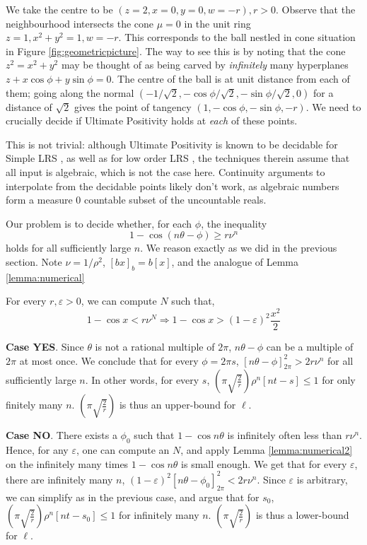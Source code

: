 We take the centre to be $(z = 2, x = 0, y= 0, w = -r), r > 0$. Observe that the neighbourhood intersects the cone $\mu = 0$ in the unit ring $z= 1, x^2 + y^2 = 1, w = -r$. This corresponds to the ball nestled in cone situation in Figure \ref{fig:geometricpicture}. The way to see this is by noting that the cone $z^2 = x^2 + y^2$ may be thought of as being carved by \textit{infinitely} many hyperplanes $z + x\cos \phi + y\sin \phi = 0$. The centre of the ball is at unit distance from each of them; going along the normal $(-1/\sqrt{2}, -\cos\phi/\sqrt{2}, -\sin\phi/\sqrt{2}, 0)$ for a distance of $\sqrt{2}$ gives the point of tangency $(1, -\cos\phi, -\sin\phi, -r)$. We need to crucially decide if Ultimate Positivity holds at \textit{each} of these points. 

This is not trivial: although Ultimate Positivity is known to be decidable for Simple LRS \cite{ouaknine2014ultimate}, as well as for low order LRS \cite{joeljames3}, the techniques therein assume that all input is algebraic, which is not the case here. Continuity arguments to interpolate from the decidable points likely don't work, as algebraic numbers form a measure $0$ countable subset of the uncountable reals.

Our problem is to decide whether, for each $\phi$, the inequality
\begin{equation}
\label{eq:ring}
1 -\cos(n\theta-\phi) \ge r\nu^n
\end{equation}
holds for all sufficiently large $n$. We reason exactly as we did in the previous section. Note $\nu = 1/\rho^2$, $[bx]_b = b[x]$, and the analogue of Lemma \ref{lemma:numerical}
\begin{lemma}
\label{lemma:numerical2}
For every $r, \varepsilon > 0$, we can compute $N$ such that,
$$1 - \cos x < r\nu^N  \Rightarrow 1- \cos x > (1 - \varepsilon)^2\frac{x^2}{2}$$
\end{lemma}

\textbf{Case YES}.
Since $\theta$ is not a rational multiple of $2\pi$, $n\theta - \phi$ can be a multiple of $2\pi$ at most once. We conclude that for every $\phi = 2\pi s$, $[n\theta-\phi]_{2\pi}^2 > 2r\nu^n$ for all sufficiently large $n$. In other words, for every $s$, $\left(\pi\sqrt{\frac{2}{r}}\right)\rho^n[nt - s] \le 1$ for only finitely many $n$. $\left(\pi\sqrt{\frac{2}{r}}\right)$ is thus an upper-bound for $\ell$.

\textbf{Case NO}.
There exists a $\phi_0$ such that $1 - \cos n\theta$ is infinitely often less than $r\nu^n$. Hence, for any $\varepsilon$, one can compute an $N$, and apply Lemma \ref{lemma:numerical2} on the infinitely many times $1 - \cos n\theta$ is small enough. We get that for every $\varepsilon$, there are infinitely many $n$, $(1-\varepsilon)^2[n\theta-\phi_0]_{2\pi}^2 < 2r\nu^n$. Since $\varepsilon$ is arbitrary, we can simplify as in the previous case, and argue that for $s_0$, $\left(\pi\sqrt{\frac{2}{r}}\right)\rho^n[nt - s_0] \le 1$ for infinitely many $n$. $\left(\pi\sqrt{\frac{2}{r}}\right)$ is thus a lower-bound for $\ell$.

